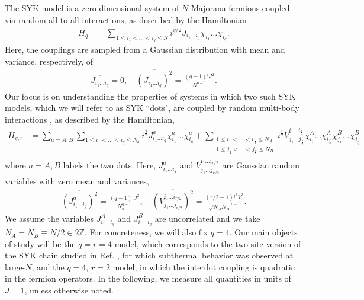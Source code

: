\documentclass[reprint, floatfix,eqsecnum,superscriptaddress,preprint,nofootinbib,onecolumn,amsmath,amssymb,aps,prb]{revtex4-2}
\begin{document}
The SYK model \cite{Kitaev2015,Maldacena2016} is a zero-dimensional system of $N$ Majorana fermions coupled via random all-to-all interactions, as described by the Hamiltonian
\begin{align}
	H_q &= \sum_{1 \leq i_1 < \dots < i_q \leq N} i^{q/2} J_{i_1\dots i_q} \chi_{i_1} \dots \chi_{i_q}.
\end{align}
Here, the couplings are sampled from a Gaussian distribution with mean and variance, respectively, of
\begin{align}
    \overline{J_{i_1 \dots i_q}} = 0 , \quad \overline{(J_{i_1\dots i_q})^2} = \frac{(q-1)! J^2}{N^{q-1}}.
\end{align}
Our focus is on understanding the properties of systems in which two such SYK models, which we will refer to as SYK ``dots", are coupled by random multi-body interactions \cite{Chen2017,Gu2017a,Haldar2018}, as described by the Hamiltonian,
\begingroup\allowdisplaybreaks
\begin{align}
	H_{q,r} &= \sum_{a=A,B} \sum_{1 \leq i_1 < \dots < i_q\leq N_a} i^{\frac{q}{2}} J^a_{i_1\dots i_q} \chi^a_{i_1} \dots \chi^a_{i_q}  +  \sum_{\substack{1 \leq i_1 <\dots < i_{\frac{r}{2}} \leq N_A \\ 1 \leq j_1 <  \dots < j_{\frac{r}{2}} \leq N_B}} i^{\frac{r}{2}}  V^{i_1 \dots i_{\frac{r}{2}}}_{j_1 \dots j_{\frac{r}{2}}} \chi_{i_1}^A \dots \chi_{i_{\frac{r}{2}}}^A \chi_{j_1}^B \dots \chi_{j_{\frac{r}{2}}}^B \label{eqn:Hqr}
\end{align}\endgroup
where $a=A,B$ labels the two dots. Here, $J^a_{i_1\dots i_q}$ and $V^{i_1 \dots i_{r/2}}_{j_1 \dots j_{r/2}}$ are Gaussian random variables with zero mean and variances,
\begin{align}
	\overline{(J_{i_1\dots i_q}^a)^2} = \frac{(q-1)! J^2}{N_a^{q-1}}, \quad \overline{(V^{i_1 \dots i_{r/2}}_{j_1 \dots j_{r/2}})^2} = \frac{(r/2-1)!^2V^2}{\sqrt{N_A N_B}^{r-1}}.
\end{align}
We assume the variables $J^A_{i_1\dots i_q}$ and $J^B_{i_1\dots i_q}$ are uncorrelated and we take $N_A = N_B \equiv N/2 \in 2 \mathbb{Z}$. For concreteness, we will also fix $q=4$. Our main objects of study will be the $q=r=4$ model, which corresponds to the two-site version of the SYK chain studied in Ref. \cite{Gu2017b}, for which subthermal behavior was observed at large-$N$, and the $q=4$, $r=2$ model, in which the interdot coupling is quadratic in the fermion operators.
In the following, we measure all quantities in units of $J=1$, unless otherwise noted. 
\end{document}
